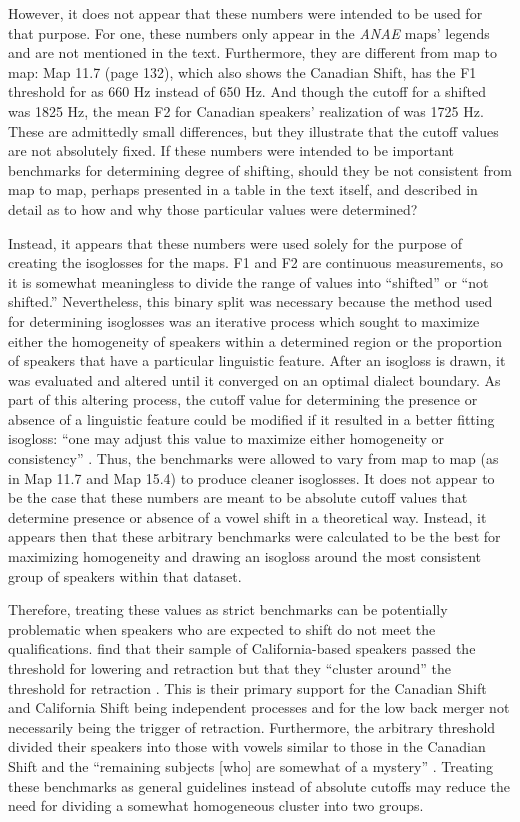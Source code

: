 However, it does not appear that these numbers were intended to be used for that purpose. For one, these numbers only appear in the \textit{ANAE} maps' legends and are not mentioned in the text. Furthermore, they are different from map to map: Map 11.7 (page 132), which also shows the Canadian Shift, has the F1 threshold for \dress as 660 Hz instead of 650 Hz. And though the cutoff for a shifted \trap was 1825 Hz, the mean F2 for Canadian speakers’ realization of \trap was 1725 Hz. These are admittedly small differences, but they illustrate that the cutoff values are not absolutely fixed. If these numbers were intended to be important benchmarks for determining degree of shifting, should they be not consistent from map to map, perhaps presented in a table in the text itself, and described in detail as to how and why those particular values were determined?

Instead, it appears that these numbers were used solely for the purpose of creating the isoglosses for the maps. F1 and F2 are continuous measurements, so it is somewhat meaningless to divide the range of values into ``shifted'' or ``not shifted.'' Nevertheless, this binary split was necessary because the method used for determining isoglosses was an iterative process which sought to maximize either the homogeneity of speakers within a determined region or the proportion of speakers that have a particular linguistic feature. After an isogloss is drawn, it was evaluated and altered until it converged on an optimal dialect boundary. As part of this altering process, the cutoff value for determining the presence or absence of a linguistic feature could be modified if it resulted in a better fitting isogloss: ``one may adjust this value to maximize either homogeneity or consistency'' \citep[43]{labov_ash_boberg_2006_anae}. Thus, the benchmarks were allowed to vary from map to map (as in Map 11.7 and Map 15.4) to produce cleaner isoglosses. It does not appear to be the case that these numbers are meant to be absolute cutoff values that determine presence or absence of a vowel shift in a theoretical way. Instead, it appears then that these arbitrary benchmarks were calculated to be the best for maximizing homogeneity and drawing an isogloss around the most consistent group of speakers within that dataset.

Therefore, treating these values as strict benchmarks can be potentially problematic when speakers who are expected to shift do not meet the qualifications. \citeauthor{kennedy_grama_2012} find that their sample of California-based speakers passed the threshold for \dress lowering and \trap retraction but that they ``cluster around'' the threshold for \lot retraction \citeyearpar[49]{kennedy_grama_2012}. This is their primary support for the Canadian Shift and California Shift being independent processes and for the low back merger not necessarily being the trigger of \trap retraction. Furthermore, the arbitrary threshold divided their speakers into those with vowels similar to those in the Canadian Shift and the ``remaining subjects [who] are somewhat of a mystery'' \citeyearpar[51]{kennedy_grama_2012}. Treating these benchmarks as general guidelines instead of absolute cutoffs may reduce the need for dividing a somewhat homogeneous cluster into two groups.

